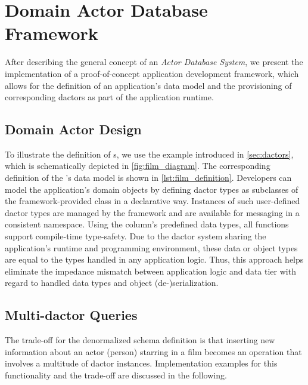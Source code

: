 
\section{Domain Actor Database Framework}\label{sec:framework}
  After describing the general concept of an \textit{Actor Database System}, we present the implementation of a proof-of-concept application development framework, which allows for the definition of an application's data model and the provisioning of corresponding \glspl{dactor} as part of the application runtime.

  \subsection{Domain Actor Design}\label{subsec:domain_actor_design}
    To illustrate the definition of s, we use the example introduced in \cref{sec:dactors}, which is schematically depicted in \cref{fig:film_diagram}.
    The corresponding definition of the 's data model is shown in \cref{lst:film_definition}.
    Developers can model the application's domain objects by defining \gls{dactor} types as subclasses of the framework-provided  class in a declarative way.
    Instances of such user-defined \gls{dactor} types are managed by the framework and are available for messaging in a consistent namespace.
    Using the column's predefined data types, all functions support compile-time type-safety.
    Due to the \gls{dactor} system sharing the application's runtime and programming environment, these data or object types are equal to the types handled in any application logic.
    Thus, this approach helps eliminate the impedance mismatch between application logic and data tier with regard to handled data types and object (de-)serialization.
  
  \subsection[Multi-Dactor Queries]{Multi-\Gls{dactor} Queries}\label{subsec:multi_dactor_queries}
    The trade-off for the denormalized schema definition is that inserting new information about an actor (person) starring in a film becomes an operation that involves a multitude of \gls{dactor} instances.
    Implementation examples for this functionality and the trade-off are discussed in the following.
    
